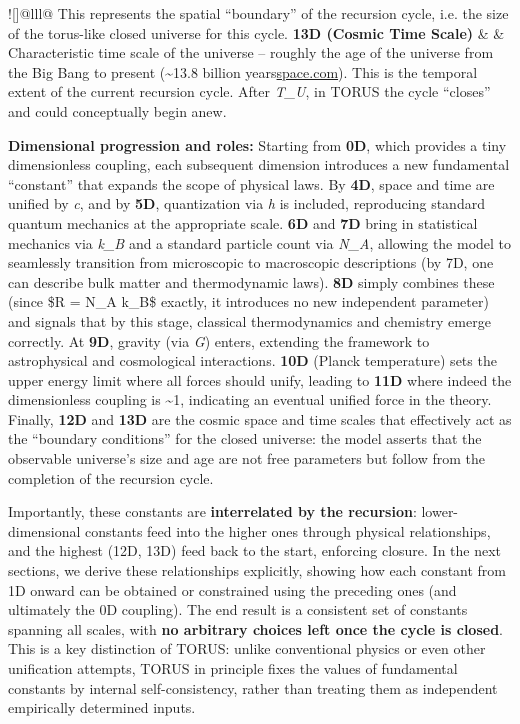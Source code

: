 \documentclass[]{article}
\let\oldlongtable\longtable
\let\endoldlongtable\endlongtable
\renewenvironment{longtable}{\begin{resizebox}{\textwidth}{!}{\oldlongtable}}{\endoldlongtable\end{resizebox}}
\begin{document}
\begin{longtable}[]{@{}lll@{}}
This represents the spatial ``boundary'' of the recursion cycle, i.e.
the size of the torus-like closed universe for this
cycle.\tabularnewline
\textbf{13D (Cosmic Time Scale)} &  &
Characteristic time scale of the universe -- roughly the age of the
universe from the Big Bang to present (\textasciitilde{}13.8 billion
years​\href{https://www.space.com/24054-how-old-is-the-universe.html\#:~:text=The\%20universe\%20is\%20approximately\%2013,than\%2014\%20billion\%20years\%20old}{space.com}).
This is the temporal extent of the current recursion cycle. After
\emph{T\_U}, in TORUS the cycle ``closes'' and could conceptually begin
anew.\tabularnewline
\bottomrule
\end{longtable}

\textbf{Dimensional progression and roles:} Starting from \textbf{0D},
which provides a tiny dimensionless coupling, each subsequent dimension
introduces a new fundamental ``constant'' that expands the scope of
physical laws. By \textbf{4D}, space and time are unified by \emph{c},
and by \textbf{5D}, quantization via \emph{h} is included, reproducing
standard quantum mechanics at the appropriate scale​. \textbf{6D} and
\textbf{7D} bring in statistical mechanics via \emph{k\_B} and a
standard particle count via \emph{N\_A}, allowing the model to
seamlessly transition from microscopic to macroscopic descriptions (by
7D, one can describe bulk matter and thermodynamic laws)​. \textbf{8D}
simply combines these (since \$R = N\_A k\_B\$ exactly, it introduces no
new independent parameter​) and signals that by this stage, classical
thermodynamics and chemistry emerge correctly. At \textbf{9D}, gravity
(via \emph{G}) enters, extending the framework to astrophysical and
cosmological interactions. \textbf{10D} (Planck temperature) sets the
upper energy limit where all forces should unify, leading to
\textbf{11D} where indeed the dimensionless coupling is
\textasciitilde{}1, indicating an eventual unified force in the theory​.
Finally, \textbf{12D} and \textbf{13D} are the cosmic space and time
scales that effectively act as the ``boundary conditions'' for the
closed universe: the model asserts that the observable universe's size
and age are not free parameters but follow from the completion of the
recursion cycle​.

Importantly, these constants are \textbf{interrelated by the recursion}:
lower-dimensional constants feed into the higher ones through physical
relationships, and the highest (12D, 13D) feed back to the start,
enforcing closure. In the next sections, we derive these relationships
explicitly, showing how each constant from 1D onward can be obtained or
constrained using the preceding ones (and ultimately the 0D coupling).
The end result is a consistent set of constants spanning all scales,
with \textbf{no arbitrary choices left once the cycle is closed}. This
is a key distinction of TORUS: unlike conventional physics or even other
unification attempts, TORUS in principle fixes the values of fundamental
constants by internal self-consistency, rather than treating them as
independent empirically determined inputs​.
\end{document}
